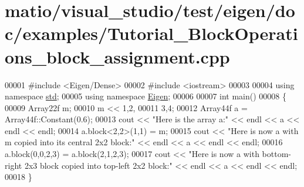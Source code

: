 \hypertarget{matio_2visual__studio_2test_2eigen_2doc_2examples_2_tutorial___block_operations__block__assignment_8cpp_source}{}\section{matio/visual\+\_\+studio/test/eigen/doc/examples/\+Tutorial\+\_\+\+Block\+Operations\+\_\+block\+\_\+assignment.cpp}
\label{matio_2visual__studio_2test_2eigen_2doc_2examples_2_tutorial___block_operations__block__assignment_8cpp_source}

\begin{DoxyCode}
00001 \textcolor{preprocessor}{#include <Eigen/Dense>}
00002 \textcolor{preprocessor}{#include <iostream>}
00003 
00004 \textcolor{keyword}{using namespace }\hyperlink{namespacestd}{std};
00005 \textcolor{keyword}{using namespace }\hyperlink{namespace_eigen}{Eigen};
00006 
00007 \textcolor{keywordtype}{int} main()
00008 \{
00009   Array22f m;
00010   m << 1,2,
00011        3,4;
00012   Array44f a = Array44f::Constant(0.6);
00013   cout << \textcolor{stringliteral}{"Here is the array a:"} << endl << a << endl << endl;
00014   a.block<2,2>(1,1) = m;
00015   cout << \textcolor{stringliteral}{"Here is now a with m copied into its central 2x2 block:"} << endl << a << endl << endl;
00016   a.block(0,0,2,3) = a.block(2,1,2,3);
00017   cout << \textcolor{stringliteral}{"Here is now a with bottom-right 2x3 block copied into top-left 2x2 block:"} << endl << a << endl 
      << endl;
00018 \}
\end{DoxyCode}
